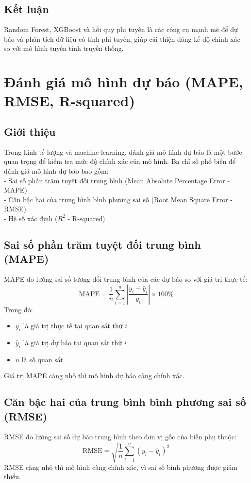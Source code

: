 \subsection{Kết luận}
Random Forest, XGBoost và hồi quy phi tuyến là các công cụ mạnh mẽ để dự báo và phân tích dữ liệu có tính phi tuyến, giúp cải thiện đáng kể độ chính xác so với mô hình tuyến tính truyền thống.






\section{Đánh giá mô hình dự báo (MAPE, RMSE, R-squared)}
\subsection{Giới thiệu}
Trong kinh tế lượng và machine learning, đánh giá mô hình dự báo là một bước quan trọng để kiểm tra mức độ chính xác của mô hình. Ba chỉ số phổ biến để đánh giá mô hình dự báo bao gồm:\\
- Sai số phần trăm tuyệt đối trung bình (Mean Absolute Percentage Error - MAPE) \\
- Căn bậc hai của trung bình bình phương sai số (Root Mean Square Error - RMSE) \\
- Hệ số xác định ($R^2$ - R-squared)

\subsection{Sai số phần trăm tuyệt đối trung bình (MAPE)}
MAPE đo lường sai số tương đối trung bình của các dự báo so với giá trị thực tế:
\begin{equation}
    \text{MAPE} = \frac{1}{n} \sum_{i=1}^{n} \left| \frac{y_i - \hat{y}_i}{y_i} \right| \times 100\%
\end{equation}
Trong đó:
\begin{itemize}
    \item $y_i$ là giá trị thực tế tại quan sát thứ $i$
    \item $\hat{y}_i$ là giá trị dự báo tại quan sát thứ $i$
    \item $n$ là số quan sát
\end{itemize}
Giá trị MAPE càng nhỏ thì mô hình dự báo càng chính xác.

\subsection{Căn bậc hai của trung bình bình phương sai số (RMSE)}
RMSE đo lường sai số dự báo trung bình theo đơn vị gốc của biến phụ thuộc:
\begin{equation}
    \text{RMSE} = \sqrt{\frac{1}{n} \sum_{i=1}^{n} (y_i - \hat{y}_i)^2}
\end{equation}
RMSE càng nhỏ thì mô hình càng chính xác, vì sai số bình phương được giảm thiểu.

